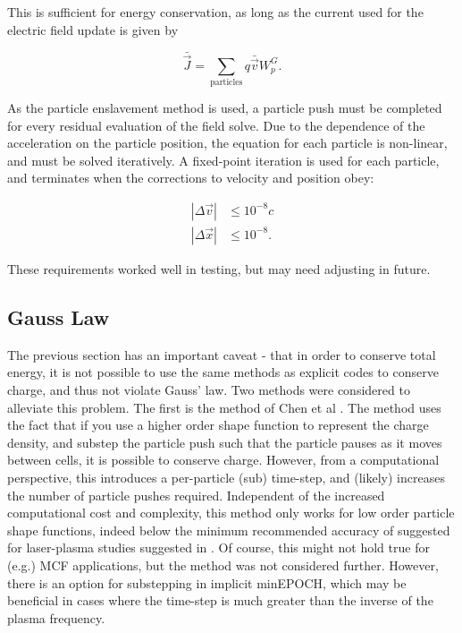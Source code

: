 \documentclass{article}
\begin{document}
This is sufficient for energy conservation, as long as the current used for the electric field update is given by

\begin{equation}
  \bar{\vec{J}} = \sum_{\mathrm{particles}} q \bar{\vec{v}} W_p^G.
\end{equation}

As the particle enslavement method is used, a particle push must be completed for every residual evaluation of the field solve. Due to the dependence of the acceleration on the particle position, the equation for each particle is non-linear, and must be solved iteratively. A fixed-point iteration is used for each particle, and terminates when the corrections to velocity and position obey:

\begin{align}
  \left| \Delta \vec{v}\right| &\leq 10^{-8} c \\
  \left| \Delta \vec{x}\right| &\leq 10^{-8}.
\end{align}

These requirements worked well in testing, but may need adjusting in future.


\subsection{Gauss Law}

The previous section has an important caveat - that in order to conserve total energy, it is not possible to use the same methods as explicit codes to conserve charge, and thus not violate Gauss' law.
Two methods were considered to alleviate this problem. The first is the method of Chen et al \cite{chen}. The method uses the fact that if you use a higher order shape function to represent the charge density, and substep the particle push such that the particle pauses as it moves between cells, it is possible to conserve charge. However, from a computational perspective, this introduces a per-particle (sub) time-step, and (likely) increases the number of particle pushes required. Independent of the increased computational cost and complexity, this method only works for low order particle shape functions, indeed below the minimum recommended accuracy of suggested for laser-plasma studies suggested in \cite{EPOCH}. Of course, this might not hold true for (e.g.) MCF applications, but the method was not considered further. However, there is an option for substepping in implicit minEPOCH, which may be beneficial in cases where the time-step is much greater than the inverse of the plasma frequency.
\end{document}
